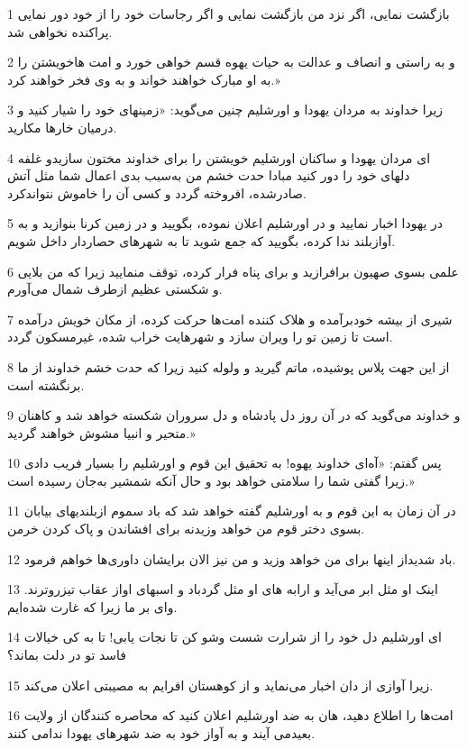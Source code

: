 \par 1 بازگشت نمایی، اگر نزد من بازگشت نمایی و اگر رجاسات خود را از خود دور نمایی پراکنده نخواهی شد.
\par 2 و به راستی و انصاف و عدالت به حیات یهوه قسم خواهی خورد و امت هاخویشتن را به او مبارک خواهند خواند و به وی فخر خواهند کرد.»
\par 3 زیرا خداوند به مردان یهودا و اورشلیم چنین می‌گوید: «زمینهای خود را شیار کنید و درمیان خارها مکارید.
\par 4 ‌ای مردان یهودا و ساکنان اورشلیم خویشتن را برای خداوند مختون سازیدو غلفه دلهای خود را دور کنید مبادا حدت خشم من به‌سبب بدی اعمال شما مثل آتش صادرشده، افروخته گردد و کسی آن را خاموش نتواندکرد.
\par 5 در یهودا اخبار نمایید و در اورشلیم اعلان نموده، بگویید و در زمین کرنا بنوازید و به آوازبلند ندا کرده، بگویید که جمع شوید تا به شهرهای حصاردار داخل شویم.
\par 6 علمی بسوی صهیون برافرازید و برای پناه فرار کرده، توقف منمایید زیرا که من بلایی و شکستی عظیم ازطرف شمال می‌آورم.
\par 7 شیری از بیشه خودبرآمده و هلاک کننده امت‌ها حرکت کرده، از مکان خویش درآمده است تا زمین تو را ویران سازد و شهرهایت خراب شده، غیرمسکون گردد.
\par 8 از این جهت پلاس پوشیده، ماتم گیرید و ولوله کنید زیرا که حدت خشم خداوند از ما برنگشته است.
\par 9 و خداوند می‌گوید که در آن روز دل پادشاه و دل سروران شکسته خواهد شد و کاهنان متحیر و انبیا مشوش خواهند گردید.»
\par 10 پس گفتم: «آه‌ای خداوند یهوه! به تحقیق این قوم و اورشلیم را بسیار فریب دادی زیرا گفتی شما را سلامتی خواهد بود و حال آنکه شمشیر به‌جان رسیده است.»
\par 11 در آن زمان به این قوم و به اورشلیم گفته خواهد شد که باد سموم ازبلندیهای بیابان بسوی دختر قوم من خواهد وزیدنه برای افشاندن و پاک کردن خرمن.
\par 12 باد شدیداز اینها برای من خواهد وزید و من نیز الان برایشان داوری‌ها خواهم فرمود.
\par 13 اینک او مثل ابر می‌آید و ارابه های او مثل گردباد و اسبهای اواز عقاب تیزروترند. وای بر ما زیرا که غارت شده‌ایم.
\par 14 ‌ای اورشلیم دل خود را از شرارت شست وشو کن تا نجات یابی! تا به کی خیالات فاسد تو در دلت بماند؟
\par 15 زیرا آوازی از دان اخبار می‌نماید و از کوهستان افرایم به مصیبتی اعلان می‌کند.
\par 16 امت‌ها را اطلاع دهید، هان به ضد اورشلیم اعلان کنید که محاصره کنندگان از ولایت بعیدمی آیند و به آواز خود به ضد شهرهای یهودا ندامی کنند.
